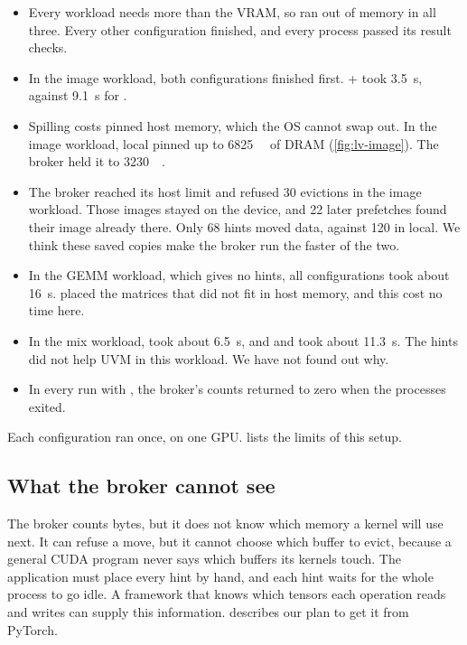 \begin{itemize}
  \item Every workload needs more than the VRAM, so  ran out of
    memory in all three. Every other configuration finished, and every
    process passed its result checks.
  \item In the image workload, both  configurations finished
    first.  + \vmemd took \SI{3.5}{\second}, against
    \SI{9.1}{\second} for .
  \item Spilling costs pinned host memory, which the OS cannot swap out. In
    the image workload,  local pinned up to \SI{6825}{\mebi\byte}
    of DRAM (\cref{fig:lv-image}). The broker held it to
    \SI{3230}{\mebi\byte}.
  \item The broker reached its host limit and refused 30 evictions in the
    image workload. Those images stayed on the device, and 22 later
    prefetches found their image already there. Only 68 hints moved data,
    against 120 in  local. We think these saved copies make the
    broker run the faster of the two.
  \item In the GEMM workload, which gives no hints, all configurations took
    about \SI{16}{\second}.  placed the matrices that did not fit
    in host memory, and this cost no time here.
  \item In the mix workload,  took about \SI{6.5}{\second}, and
     and  took about \SI{11.3}{\second}. The hints did not
    help UVM in this workload. We have not found out why.
  \item In every run with \vmemd, the broker's counts returned to zero when
    the processes exited.
\end{itemize}

Each configuration ran once, on one GPU.  lists the
limits of this setup.


\subsection{What the broker cannot see}
\label{sec:lv-gap}

The broker counts bytes, but it does not know which memory a kernel will use
next. It can refuse a move, but it cannot choose which buffer to evict,
because a general CUDA program never says which buffers its kernels touch.
The application must place every hint by hand, and each hint waits for the
whole process to go idle. A framework that knows which tensors each operation
reads and writes can supply this information.  describes
our plan to get it from PyTorch.
